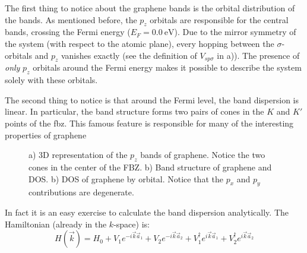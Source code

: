 The first thing to notice about the graphene bands is the orbital distribution of the bands. As mentioned before, the $p_z$ orbitals are responsible for the central bands, crossing the Fermi energy ($E_F=\SI{0.0}{\eV}$). Due to the mirror symmetry of the system (with respect to the atomic plane), every hopping between the $\sigma$-orbitals and $p_z$ vanishes exactly (see the definition of $V_{sp\sigma}$ in a)).
The presence of \textit{only} $p_z$ orbitals around the Fermi energy makes it possible to describe the system solely with these orbitals.

The second thing to notice is that around the Fermi level, the band dispersion is linear. In particular, the band structure forms two pairs of cones in the $K$ and $K'$ points of the \ac{fbz}. This famous feature %
is responsible for many of the interesting properties of graphene %
\begin{figure}[h!]
\begin{center}
\end{center}
\vspace{-15pt}
\caption{a) 3D representation of the $p_z$ bands of graphene. Notice the two cones in the center of the FBZ. b) Band structure of graphene and DOS. b) DOS of graphene by orbital. Notice that the $p_x$ and $p_y$ contributions are degenerate.}
\label{bandsG}
\end{figure}
\FloatBarrier
In fact it is an easy exercise to calculate the band dispersion analytically. The Hamiltonian (already in the $k$-space) is:
\begin{equation}
   H(\vec{k}) = H_0 + V_1 e^{-i\vec{k}\vec{a}_1} + V_2 e^{-i\vec{k}\vec{a}_2}+
   V^{\dagger}_1 e^{i\vec{k}\vec{a}_1} + V^{\dagger}_2 e^{i\vec{k}\vec{a}_2}
\label{hk}
\end{equation}
